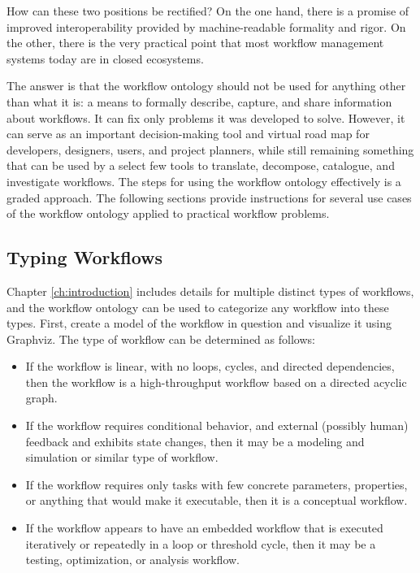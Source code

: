 How can these two positions be rectified? On the one hand, there is a promise of
improved interoperability provided by machine-readable formality and rigor. On
the other, there is the very practical point that most workflow management
systems today are in closed ecosystems.

The answer is that the workflow ontology should not be used for anything other
than what it is: a means to formally describe, capture, and share information
about workflows. It can fix only problems it was developed to solve. However, it
can serve as an important decision-making tool and virtual road map for
developers, designers, users, and project planners, while still remaining
something that can be used by a select few tools to translate, decompose,
catalogue, and investigate workflows. The steps for using the workflow ontology
effectively is a graded approach. The following sections provide instructions
for several use cases of the workflow ontology applied to practical workflow
problems.

\subsection{Typing Workflows}

Chapter \ref{ch:introduction} includes details for multiple distinct types of
workflows, and the workflow ontology can be used to categorize any workflow into
these types. First, create a model of the workflow in question and visualize it
using Graphviz. The type of workflow can be determined as follows:
\begin{itemize}
  \item If the workflow is linear, with no loops, cycles, and directed
  dependencies, then the workflow is a high-throughput workflow based on a
  directed acyclic graph.
  \item If the workflow requires conditional behavior, and external (possibly
  human) feedback and exhibits state changes, then it may be a
  modeling and simulation or similar type of workflow.
  \item If the workflow requires only tasks with few concrete parameters,
  properties, or anything that would make it executable, then it is a conceptual
  workflow.
  \item If the workflow appears to have an embedded workflow that is executed
  iteratively or repeatedly in a loop or threshold cycle, then it may be a
  testing, optimization, or analysis workflow.
\end{itemize}

